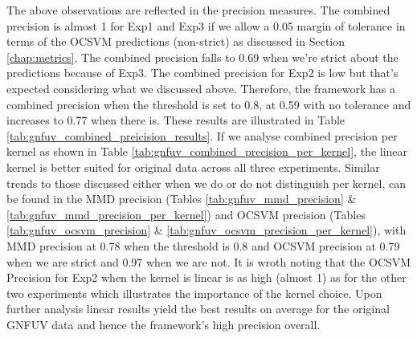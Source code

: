 \documentclass{mpaper}
\begin{document}
The above observations are reflected in the precision measures. The combined precision is almost 1 for Exp1 and Exp3 if we allow a 0.05 margin of tolerance in terms of the OCSVM predictions (non-strict) as discussed in Section \ref{chap:metrics}. The combined precision falls to 0.69 when we're strict about the predictions because of Exp3. The combined precision for Exp2 is low but that's expected considering what we discussed above. Therefore, the framework has a combined precision when the threshold is set to 0.8, at 0.59 with no tolerance and increases to 0.77 when there is. These results are illustrated in Table \ref{tab:gnfuv_combined_preicision_results}. If we analyse combined precision per kernel as shown in Table \ref{tab:gnfuv_combined_precision_per_kernel}, the linear kernel is better suited for original data across all three experiments. Similar trends to those discussed either when we do or do not distinguish per kernel, can be found in the MMD precision (Tables \ref{tab:gnfuv_mmd_precision} \& \ref{tab:gnfuv_mmd_precision_per_kernel}) and OCSVM precision (Tables \ref{tab:gnfuv_ocsvm_precision} \& \ref{tab:gnfuv_ocsvm_precision_per_kernel}), with MMD precision at 0.78 when the threshold is 0.8 and OCSVM precision at 0.79 when we are strict and 0.97 when we are not. It is wroth noting that the OCSVM Precision for Exp2 when the kernel is linear is as high (almost 1) as for the other two experiments which illustrates the importance of the kernel choice. Upon further analysis linear results yield the best results on average for the original GNFUV data and hence the framework's high precision overall. 
\end{document}
